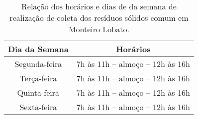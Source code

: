\begin{table}[htbp]
\caption{Relação dos horários e dias de da semana de realização de coleta dos resíduos sólidos comum em Monteiro Lobato.}
\begin{center}
\begin{tabular}{|c|c|}
\hline
\textbf{Dia da Semana} & \textbf{Horários} \\ \hline
Segunda-feira & 7h às 11h – almoço – 12h às 16h \\ \hline
Terça-feira & 7h às 11h – almoço – 12h às 16h \\ \hline
Quinta-feira & 7h às 11h – almoço – 12h às 16h \\ \hline
Sexta-feira & 7h às 11h – almoço – 12h às 16h \\ \hline
\end{tabular}
\end{center}
\label{tab:coleta_municipal}
\end{table}
